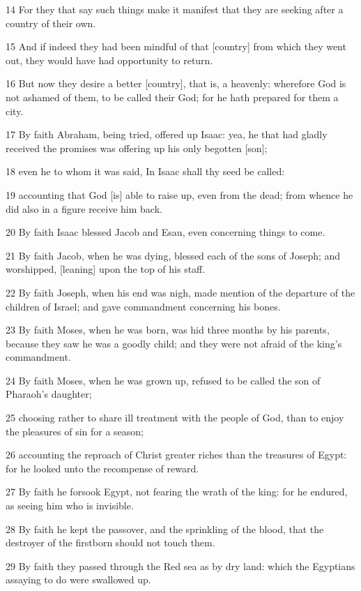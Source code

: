 \par 14 For they that say such things make it manifest that they are seeking after a country of their own.
\par 15 And if indeed they had been mindful of that [country] from which they went out, they would have had opportunity to return.
\par 16 But now they desire a better [country], that is, a heavenly: wherefore God is not ashamed of them, to be called their God; for he hath prepared for them a city.
\par 17 By faith Abraham, being tried, offered up Isaac: yea, he that had gladly received the promises was offering up his only begotten [son];
\par 18 even he to whom it was said, In Isaac shall thy seed be called:
\par 19 accounting that God [is] able to raise up, even from the dead; from whence he did also in a figure receive him back.
\par 20 By faith Isaac blessed Jacob and Esau, even concerning things to come.
\par 21 By faith Jacob, when he was dying, blessed each of the sons of Joseph; and worshipped, [leaning] upon the top of his staff.
\par 22 By faith Joseph, when his end was nigh, made mention of the departure of the children of Israel; and gave commandment concerning his bones.
\par 23 By faith Moses, when he was born, was hid three months by his parents, because they saw he was a goodly child; and they were not afraid of the king's commandment.
\par 24 By faith Moses, when he was grown up, refused to be called the son of Pharaoh's daughter;
\par 25 choosing rather to share ill treatment with the people of God, than to enjoy the pleasures of sin for a season;
\par 26 accounting the reproach of Christ greater riches than the treasures of Egypt: for he looked unto the recompense of reward.
\par 27 By faith he forsook Egypt, not fearing the wrath of the king: for he endured, as seeing him who is invisible.
\par 28 By faith he kept the passover, and the sprinkling of the blood, that the destroyer of the firstborn should not touch them.
\par 29 By faith they passed through the Red sea as by dry land: which the Egyptians assaying to do were swallowed up.
